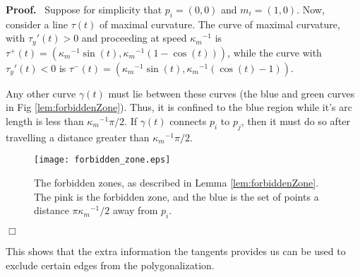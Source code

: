 \documentclass{article}
\newenvironment{proof}{
  \noindent\textbf{Proof.}\ }{\hspace*{\fill}
  \begin{math}\Box\end{math}\medskip}
\numberwithin{cntr}{section}
\numberwithin{equation}{section}
\newcommand{\kmax}{{\kappa_{m}}}
\newcommand{\kmaxi}{{\kmax^{-1}}}
\begin{document}
\begin{proof}
  Suppose for simplicity that $p_{i}=(0,0)$ and $m_{i}=(1,0)$. Now, consider a line $\tau(t)$ of maximal curvature. The curve of maximal curvature, with $\tau_{y}'(t) > 0$ and proceeding at speed $\kmaxi$ is $\tau^{+}(t)=(\kmaxi \sin(t), \kmaxi (1-\cos(t)))$, while the curve with $\tau_{y}'(t) < 0$ is $\tau^{-}(t)=(\kmaxi \sin(t), \kmaxi (\cos(t)-1))$.

Any other curve $\gamma(t)$ must lie between these curves (the blue and green curves in Fig \ref{lem:forbiddenZone}). Thus, it is confined to the blue region while it's arc length is less than $\kmaxi \pi/2$. If $\gamma(t)$ connects $p_{i}$ to $p_{j}$, then it must do so after travelling a distance greater than $\kmaxi \pi/2$.

\begin{figure}
\setlength{\unitlength}{0.240900pt}
\ifx\plotpoint\undefined\newsavebox{\plotpoint}\fi
\sbox{\plotpoint}{\rule[-0.200pt]{0.400pt}{0.400pt}}%
\texttt{[image: forbidden\_zone.eps]}

\caption{The forbidden zones, as described in Lemma \ref{lem:forbiddenZone}. The pink is the forbidden zone, and the blue is the set of points a distance $\pi \kmaxi/2$ away from $p_{i}$.}
\label{fig:forbiddenZone}
\end{figure}
\end{proof}

This shows that the extra information the tangents provides us can be used to exclude certain edges from the polygonalization.








\end{document}
